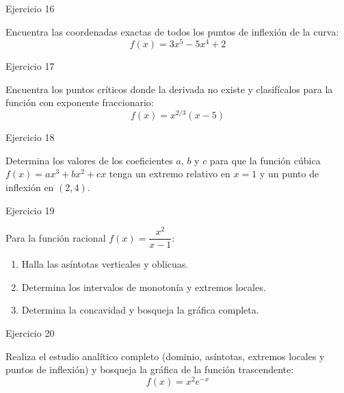 \documentclass[aspectratio=169]{beamer}
\begin{document}
\begin{frame}{Ejercicio 16}
  \begin{mwejercicio}
    Encuentra las coordenadas exactas de todos los puntos de inflexión de la curva:
    $$f(x) = 3x^5 - 5x^4 + 2$$
  \end{mwejercicio}
  \vspace{3.5cm}
\end{frame}
\begin{frame}{Ejercicio 17}
  \begin{mwejercicio}
    Encuentra los puntos críticos donde la derivada no existe y clasifícalos para la función con exponente fraccionario:
    $$f(x) = x^{2/3}(x - 5)$$
  \end{mwejercicio}
  \vspace{3.5cm}
\end{frame}
\begin{frame}{Ejercicio 18}
  \begin{mwejercicio}
    Determina los valores de los coeficientes $a$, $b$ y $c$ para que la función cúbica $f(x) = ax^3 + bx^2 + cx$ tenga un extremo relativo en $x = 1$ y un punto de inflexión en $(2, 4)$.
  \end{mwejercicio}
  \vspace{3.5cm}
\end{frame}
\begin{frame}{Ejercicio 19}
  \begin{mwejercicio}
    Para la función racional $f(x) = \dfrac{x^2}{x - 1}$:
    \begin{enumerate}
      \item Halla las asíntotas verticales y oblicuas.
      \item Determina los intervalos de monotonía y extremos locales.
      \item Determina la concavidad y bosqueja la gráfica completa.
    \end{enumerate}
  \end{mwejercicio}
  \vspace{2.5cm}
\end{frame}
\begin{frame}{Ejercicio 20}
  \begin{mwejercicio}
    Realiza el estudio analítico completo (dominio, asíntotas, extremos locales y puntos de inflexión) y bosqueja la gráfica de la función trascendente:
    $$f(x) = x^2 e^{-x}$$
  \end{mwejercicio}
  \vspace{3.5cm}
\end{frame}
\end{document}
